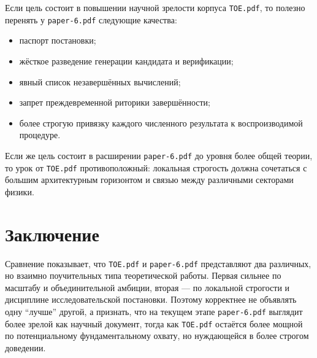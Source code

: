 \documentclass[12pt,a4paper]{article}
\begin{document}
Если цель состоит в повышении научной зрелости корпуса \texttt{TOE.pdf}, то полезно перенять у \texttt{paper-6.pdf} следующие качества:
\begin{itemize}
    \item паспорт постановки;
    \item жёсткое разведение генерации кандидата и верификации;
    \item явный список незавершённых вычислений;
    \item запрет преждевременной риторики завершённости;
    \item более строгую привязку каждого численного результата к воспроизводимой процедуре.
\end{itemize}

Если же цель состоит в расширении \texttt{paper-6.pdf} до уровня более общей теории, то урок от \texttt{TOE.pdf} противоположный: локальная строгость должна сочетаться с большим архитектурным горизонтом и связью между различными секторами физики.

\section{Заключение}

Сравнение показывает, что \texttt{TOE.pdf} и \texttt{paper-6.pdf} представляют два различных, но взаимно поучительных типа теоретической работы. Первая сильнее по масштабу и объединительной амбиции, вторая --- по локальной строгости и дисциплине исследовательской постановки. Поэтому корректнее не объявлять одну ``лучше'' другой, а признать, что на текущем этапе \texttt{paper-6.pdf} выглядит более зрелой как научный документ, тогда как \texttt{TOE.pdf} остаётся более мощной по потенциальному фундаментальному охвату, но нуждающейся в более строгом доведении.
\end{document}
